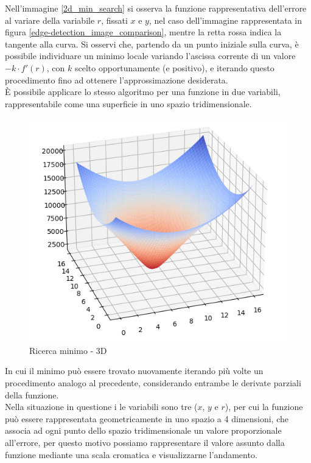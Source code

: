 \documentclass[12pt]{article}
\begin{document}
        Nell'immagine \ref{2d_min_search} si osserva la funzione rappresentativa dell'errore al variare della variabile $r$, fissati $x$ e $y$, nel caso dell'immagine rappresentata in figura \ref{edge-detection_image_comparison}, mentre la retta rossa indica la tangente alla curva. Si osservi che, partendo da un punto iniziale sulla curva, è possibile individuare un minimo locale variando l'ascissa corrente di un valore $-k \cdot f'(r)$, con $k$ scelto opportunamente (e positivo), e iterando questo procedimento fino ad ottenere l'approssimazione desiderata.\\
        
        È possibile applicare lo stesso algoritmo per una funzione in due variabili, rappresentabile come una superficie in uno spazio tridimensionale.
        
        \begin{figure}[h]
        \centering
            \includegraphics[width=\textwidth-50pt]{Draws/matplotlib_draws/3d_descent_base_cut.png}
            \caption{Ricerca minimo - 3D}
            \label{3d_min_search}
        \end{figure}
        
        In cui il minimo può essere trovato nuovamente iterando più volte un procedimento analogo al precedente, considerando entrambe le derivate parziali della funzione.\\
        
        
        \vspace{1cm}
        Nella situazione in questione i le variabili sono tre ($x$, $y$ e $r$), per cui la funzione può essere rappresentata geometricamente in uno spazio a 4 dimensioni, che associa ad ogni punto dello spazio tridimensionale un valore proporzionale all'errore, per questo motivo possiamo rappresentare il valore assunto dalla funzione mediante una scala cromatica e visualizzarne l'andamento.
        
\end{document}
